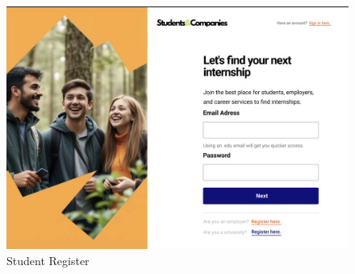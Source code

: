 \documentclass{article}
\begin{document}
\begin{figure}[H]
    \centering
    \includegraphics[scale = 0.40]{figures/UserInterfaces/General/StudentRegister.png}
    \caption{Student Register}
     \centering
\end{figure}
\end{document}
